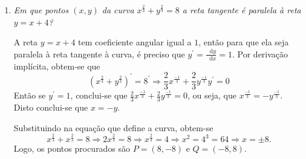 \documentclass[12pt,a4paper]{article}
\newcommand*\diff{\mathop{}\!\mathrm{d}}
\begin{document}
\begin{enumerate}
\item \textit{Em que pontos $(x,y)$ da curva $x^\frac{2}{3} + y^\frac{2}{3} = 8$ a reta tangente é paralela à reta $y = x + 4$?}

A reta $y = x + 4$ tem coeficiente angular igual a $1$, então para que ela seja paralela à reta tangente à curva, é preciso que $y^\prime = \frac{\diff{y}}{\diff{x}} = 1$. Por derivação implícita, obtem-se que
\[
\left(x^\frac{2}{3} + y^\frac{2}{3}\right)^\prime = 8^\prime
\Rightarrow \frac{2}{3}x^{\frac{-1}{3}} + \frac{2}{3}y^{\frac{-1}{3}}y^\prime = 0
\]
Então se $y^\prime = 1$, conclui-se que $\frac{2}{3}x^{\frac{-1}{3}} + \frac{2}{3}y^{\frac{-1}{3}} = 0$, ou seja, que $x^{\frac{-1}{3}} = -y^{\frac{-1}{3}}$. Disto conclui-se que $x=-y$.

Substituindo na equação que define a curva, obtem-se
\[
x^\frac{2}{3} + x^\frac{2}{3} = 8
\Rightarrow 2x^\frac{2}{3} = 8
\Rightarrow x^\frac{2}{3} = 4
\Rightarrow x^2 = 4^3 = 64
\Rightarrow x = \pm 8.
\]
Logo, os pontos procurados são $P = (8,-8)$ e $Q=(-8,8)$.

\end{enumerate}
\end{document}
